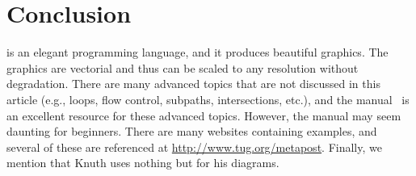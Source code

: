 \section{Conclusion}
\label{sec:conclusion}

\MP{} is an elegant programming language, and it produces beautiful graphics.  The graphics are vectorial and thus can be scaled to any resolution without degradation.  There are many advanced topics that are not discussed in this article (e.g., loops, flow control, subpaths, intersections, etc.), and the \MP{} manual~\cite{hobby:user} is an excellent resource for these advanced topics.  However, the \MP{} manual may seem daunting for beginners.  There are many websites containing \MP{} examples, and several of these are referenced at \url{http://www.tug.org/metapost}.  Finally, we mention that Knuth uses nothing but \MP{} for his diagrams.
